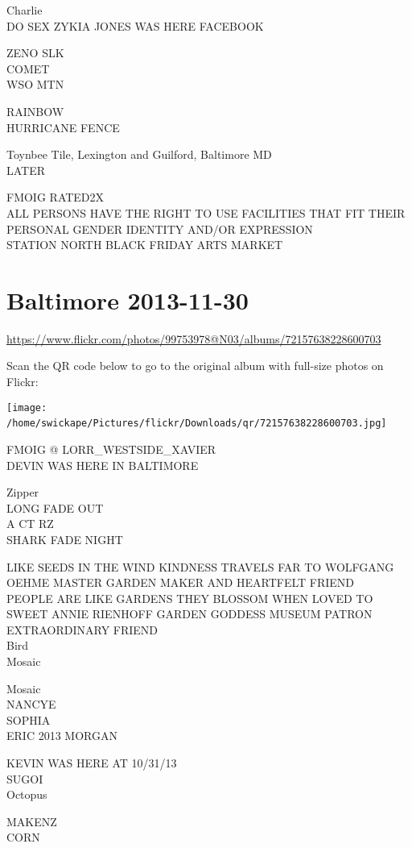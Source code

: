 \documentclass[10pt,letterpaper]{article}
\begin{document}
Charlie\\
DO SEX ZYKIA JONES WAS HERE FACEBOOK

ZENO SLK\\
COMET\\
WSO MTN

RAINBOW\\
HURRICANE FENCE

Toynbee Tile, Lexington and Guilford, Baltimore MD\\
LATER

FMOIG RATED2X\\
ALL PERSONS HAVE THE RIGHT TO USE FACILITIES THAT FIT THEIR PERSONAL GENDER IDENTITY AND/OR EXPRESSION\\
STATION NORTH BLACK FRIDAY ARTS MARKET
\

\section*{Baltimore 2013-11-30}

\url{https://www.flickr.com/photos/99753978@N03/albums/72157638228600703}

Scan the QR code below to go to the original album with full-size photos on Flickr:

\texttt{[image: /home/swickape/Pictures/flickr/Downloads/qr/72157638228600703.jpg]}
\

FMOIG @ LORR\_WESTSIDE\_XAVIER\\
DEVIN WAS HERE IN BALTIMORE

Zipper\\
LONG FADE OUT\\
A CT RZ\\
SHARK FADE NIGHT

LIKE SEEDS IN THE WIND KINDNESS TRAVELS FAR TO WOLFGANG OEHME MASTER GARDEN MAKER AND HEARTFELT FRIEND\\
PEOPLE ARE LIKE GARDENS THEY BLOSSOM WHEN LOVED TO SWEET ANNIE RIENHOFF GARDEN GODDESS MUSEUM PATRON EXTRAORDINARY FRIEND\\
Bird\\
Mosaic

Mosaic\\
NANCYE\\
SOPHIA\\
ERIC 2013 MORGAN

KEVIN WAS HERE AT 10/31/13\\
SUGOI\\
Octopus

MAKENZ\\
CORN
\end{document}
